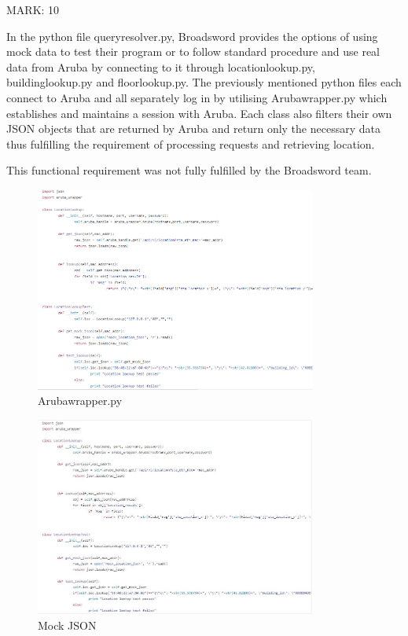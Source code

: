 \documentclass{article}
\begin{document}
\begin{flushleft}
MARK: 10
\end{flushleft}

\begin{flushleft}
In the python file query\textunderscore resolver.py, Broadsword provides the options of using mock data to test their program or to follow standard procedure and use real data from Aruba by connecting to it through location\textunderscore lookup.py, building\textunderscore lookup.py and floor\textunderscore lookup.py. The previously mentioned python files each connect to Aruba and all separately log in by utilising Aruba\textunderscore wrapper.py which establishes and maintains a session with Aruba. Each class also filters their own JSON objects that are returned by Aruba and return only the necessary data thus fulfilling the requirement of processing requests and retrieving location. 
\end{flushleft}
  
\begin{flushleft}
This functional requirement was not fully fulfilled by the Broadsword team.
\end{flushleft}

\begin{figure}[ht]
  \includegraphics[width=350px]{Images/getLoc.PNG}
  \caption{Aruba\textunderscore wrapper.py}
  \label{arubawrapper.py}
\end{figure}
\newpage
\begin{figure}[ht]
  \includegraphics[width=350px]{Images/LocLookup.JPG}
  \caption{Mock JSON}

\label{Mock JSON}
\end{figure}
\end{document}

